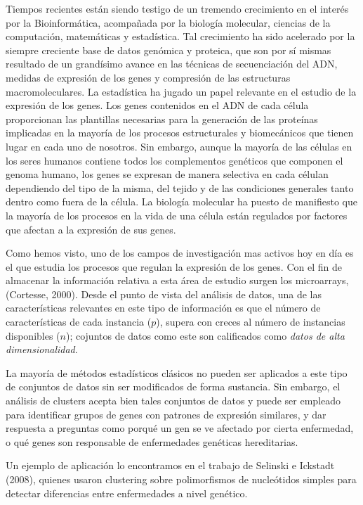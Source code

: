 Tiempos recientes están siendo testigo de un tremendo crecimiento en el interés por la Bioinformática, acompañada por la biología molecular, ciencias de la computación, matemáticas y estadística. Tal crecimiento ha sido acelerado por la siempre creciente base de datos genómica y proteica, que son por sí mismas resultado de un grandísimo avance en las técnicas de secuenciación del ADN, medidas de expresión de los genes y compresión de las estructuras macromoleculares. La estadística ha jugado un papel relevante en el estudio de la expresión de los genes. Los genes contenidos en el ADN de cada célula proporcionan las plantillas necesarias para la generación de las proteínas implicadas en la mayoría de los procesos estructurales y biomecánicos que tienen lugar en cada uno de nosotros. Sin embargo, aunque la mayoría de las células en los seres humanos contiene todos los complementos genéticos que componen el genoma humano, los genes se expresan de manera selectiva en cada célulan dependiendo del tipo de la misma, del tejido y de las condiciones generales tanto dentro como fuera de la célula. La biología molecular ha puesto de manifiesto que la mayoría de los procesos en la vida de una célula están regulados por factores que afectan a la expresión de sus genes.

Como hemos visto, uno de los campos de investigación mas activos hoy en día es el que estudia los procesos que regulan la expresión de los genes. Con el fin de almacenar la información relativa a esta área de estudio surgen los microarrays, (Cortesse, 2000). Desde el punto de vista del análisis de datos, una de las características relevantes en este tipo de información es que el número de características de cada instancia ($p$), supera con creces al número de instancias disponibles ($n$); cojuntos de datos como este son calificados como \textit{datos de alta dimensionalidad}.

La mayoría de métodos estadísticos clásicos no pueden ser aplicados a este tipo de conjuntos de datos sin ser modificados de forma sustancia. Sin embargo, el análisis de clusters acepta bien tales conjuntos de datos y puede ser empleado para identificar grupos de genes con patrones de expresión similares, y dar respuesta a preguntas como porqué un gen se ve afectado por cierta enfermedad, o qué genes son responsable de enfermedades genéticas hereditarias.

Un ejemplo de aplicación lo encontramos en el trabajo de Selinski e Ickstadt (2008), quienes usaron clustering sobre polimorfismos de nucleótidos simples para detectar diferencias entre enfermedades a nivel genético.


